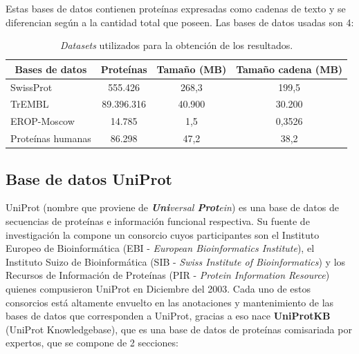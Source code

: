 Estas bases de datos contienen proteínas expresadas como cadenas de texto y se diferencian según a la cantidad total que poseen. Las bases de datos usadas son 4:

\begin{table}[h]
\centering
\begin{tabular}{|l|c|c|c|}
\hline
\multicolumn{1}{|c|}{\textbf{Bases de datos}} & \textbf{Proteínas} & \textbf{Tamaño (MB)} & \textbf{Tamaño cadena (MB)} \\ \hline
SwissProt    & 555.426                & 268,3                & 199,5              \\
TrEMBL        & 89.396.316              & 40.900      & 30.200   \\
EROP-Moscow        & 14.785                 & 1,5                  & 0,3526                \\
Proteínas humanas     & 86.298                 & 47,2                 & 38,2               \\ \hline
\end{tabular}
\caption{\textit{Datasets} utilizados para la obtención de los resultados.}
\label{tb:labelea1}
\end{table} 

\subsection{Base de datos UniProt}

UniProt (nombre que proviene de \textit{\textbf{Uni}versal \textbf{Prot}ein}) es una base de datos de secuencias de proteínas e información funcional respectiva. Su fuente de investigación la compone un consorcio cuyos participantes son el Instituto Europeo de Bioinformática (EBI - \textit{European Bioinformatics Institute}), el Instituto Suizo de Bioinformática (SIB - \textit{Swiss Institute of Bioinformatics}) y los Recursos de Información de Proteínas (PIR - \textit{Protein Information Resource}) quienes compusieron UniProt en Diciembre del 2003. Cada uno de estos consorcios está altamente envuelto en las anotaciones y mantenimiento de las bases de datos que corresponden a UniProt, gracias a eso nace \textbf{UniProtKB} (UniProt Knowledgebase), que es una base de datos de proteínas comisariada por expertos, que se compone de 2 secciones:


